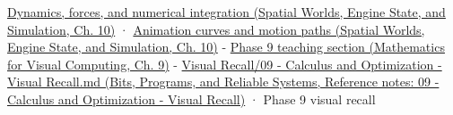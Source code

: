 \href{../05-Spatial-Worlds-Engine-State-and-Simulation/main.pdf\#nameddest=04-visual-computing-ii-ch029-dynamics-forces-and-numerical-integration}{Dynamics, forces, and numerical integration (Spatial Worlds, Engine State, and Simulation, Ch. 10)} · \href{../05-Spatial-Worlds-Engine-State-and-Simulation/main.pdf\#nameddest=04-visual-computing-ii-ch029-animation-curves-and-motion-paths}{Animation curves and motion paths (Spatial Worlds, Engine State, and Simulation, Ch. 10)} - \href{../02-Mathematics-for-Visual-Computing/main.pdf\#nameddest=02-foundations-ii-ch025-odes-and-numerical-simulation}{Phase 9 teaching section (Mathematics for Visual Computing, Ch. 9)} - \href{../01-Bits-Programs-and-Reliable-Systems/main.pdf\#nameddest=appendix-adf48f5dc5c1}{Visual Recall/09 - Calculus and Optimization - Visual Recall.md (Bits, Programs, and Reliable Systems, Reference notes: 09 - Calculus and Optimization - Visual Recall)} · Phase 9 visual recall
